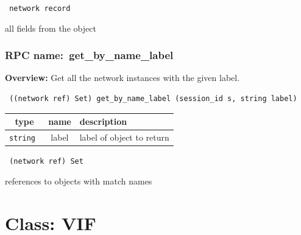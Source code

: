 \vspace{0.3cm}

{\tt 
network record
}


all fields from the object
\vspace{0.3cm}
\vspace{0.3cm}
\vspace{0.3cm}
\subsubsection{RPC name:~get\_by\_name\_label}

{\bf Overview:} 
Get all the network instances with the given label.

\begin{verbatim} ((network ref) Set) get_by_name_label (session_id s, string label)\end{verbatim}



 
\vspace{0.3cm}
\begin{tabular}{|c|c|p{7cm}|}
 \hline
{\bf type} & {\bf name} & {\bf description} \\ \hline
{\tt string } & label & label of object to return \\ \hline 

\end{tabular}

\vspace{0.3cm}

{\tt 
(network ref) Set
}


references to objects with match names
\vspace{0.3cm}
\vspace{0.3cm}
\vspace{0.3cm}

\vspace{1cm}
\newpage
\section{Class: VIF}
